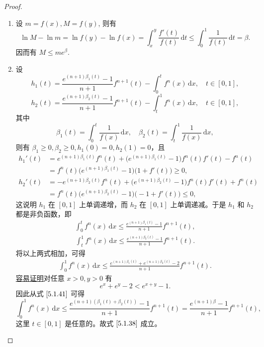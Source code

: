 \documentclass[../../main.tex]{subfiles}%
\begin{document}
\begin{proof}
\begin{enumerate}
\item 设 \( m = f(x), M = f(y) \), 则有  
\[
\ln M - \ln m = \ln f(y) - \ln f(x) = \int_{x}^{y} \frac{f'(t)}{f(t)} \, \mathrm{d}t \leqslant \int_{0}^{1} \frac{1}{f(t)} \, \mathrm{d}t = \beta.
\]  
因而有 \( M \leqslant m e^{\beta} \).

\item 设  
\[
h_1(t) = \frac{e^{(n + 1)\beta_1(t)} - 1}{n + 1} f^{n + 1}(t) - \int_{0}^{t} f^n(x) \, \mathrm{d}x, \quad t \in [0,1],
\]  
\[
h_2(t) = \frac{e^{(n + 1)\beta_2(t)} - 1}{n + 1} f^{n + 1}(t) - \int_{t}^{1} f^n(x) \, \mathrm{d}x, \quad t \in [0,1],
\]  
其中  
\[
\beta_1(t) = \int_{0}^{t} \frac{1}{f(x)} \, \mathrm{d}x, \quad \beta_2(t) = \int_{t}^{1} \frac{1}{f(x)} \, \mathrm{d}x,
\]  
则有 \( \beta_1 \geqslant 0, \beta_2 \geqslant 0, h_1(0) = 0, h_2(1) = 0 \)，且  
\[
\begin{aligned}
h_1'(t) &= e^{(n + 1)\beta_1(t)} f^n(t) + \big( e^{(n + 1)\beta_1(t)} - 1 \big) f^n(t) f'(t) - f^n(t) \\
&= f^n(t) \big( e^{(n + 1)\beta_1(t)} - 1 \big) \big( 1 + f'(t) \big) \geqslant 0,
\end{aligned}
\]  
\[
\begin{aligned}
h_2'(t) &= -e^{(n + 1)\beta_2(t)} f^n(t) + \big( e^{(n + 1)\beta_2(t)} - 1 \big) f^n(t) f'(t) + f^n(t) \\
&= f^n(t) \big( e^{(n + 1)\beta_2(t)} - 1 \big) \big( -1 + f'(t) \big) \leqslant 0,
\end{aligned}
\]  
这说明 \( h_1 \) 在 \([0,1]\) 上单调递增，而 \( h_2 \) 在 \([0,1]\) 上单调递减。于是 \( h_1 \) 和 \( h_2 \) 都是非负函数，即  
\begin{align}
\int_{0}^{t} f^n(x) \, \mathrm{d}x \leqslant \frac{e^{(n + 1)\beta_1(t)} - 1}{n + 1} f^{n + 1}(t), \label{5.1.39}
\end{align}  
\begin{align}
\int_{t}^{1} f^n(x) \, \mathrm{d}x \leqslant \frac{e^{(n + 1)\beta_2(t)} - 1}{n + 1} f^{n + 1}(t). \label{5.1.40}
\end{align}  
将以上两式相加，可得  
\begin{align}
\int_{0}^{1} f^n(x) \, \mathrm{d}x \leqslant \frac{e^{(n + 1)\beta_1(t)} + e^{(n + 1)\beta_2(t)} - 2}{n + 1} f^{n + 1}(t). \label{5.1.41}
\end{align}  
\hyperref[proposition:指数对数函数不等式3]{容易证明}对任意 \( x > 0, y > 0 \) 有  
\[
e^x + e^y - 2 < e^{x + y} - 1.
\]  
因此从式 \(\eqref{5.1.41}\) 可得  
\[
\int_{0}^{1} f^n(x) \, \mathrm{d}x \leqslant \frac{e^{(n + 1)(\beta_1(t) + \beta_2(t))} - 1}{n + 1} f^{n + 1}(t) = \frac{e^{(n + 1)\beta} - 1}{n + 1} f^{n + 1}(t),
\]  
这里 \( t \in [0,1] \) 是任意的。故式 \(\eqref{5.1.38}\) 成立。
\end{enumerate}
\end{proof}
\end{document}
